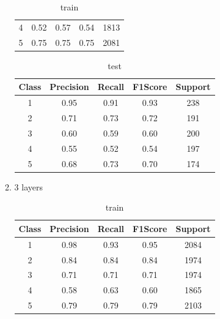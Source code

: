 \begin{enumerate}[label=(\alph*)]
\begin{enumerate}[label=\roman*.]
\begin{table}[!htb]
\begin{tabular}{ccccc}
            4     & 0.52      & 0.57   & 0.54    & 1813    \\
            5     & 0.75      & 0.75   & 0.75    & 2081    \\ \hline
            \end{tabular}
            \caption{train}
            \label{part e train depth 2}
        \end{table}
        \begin{table}[!htb]
            \centering
            \begin{tabular}{ccccc}
            \hline
            Class & Precision & Recall & F1Score & Support \\ \hline
            1     & 0.95      & 0.91   & 0.93    & 238     \\
            2     & 0.71      & 0.73   & 0.72    & 191     \\
            3     & 0.60      & 0.59   & 0.60    & 200     \\
            4     & 0.55      & 0.52   & 0.54    & 197     \\
            5     & 0.68      & 0.73   & 0.70    & 174     \\ \hline
            \end{tabular}
            \caption{test}
            \label{part e test depth 2}
        \end{table}
        \item 3 layers
        \begin{table}[!htb]
            \centering
            \begin{tabular}{ccccc}
            \hline
            Class & Precision & Recall & F1Score & Support \\ \hline
            1     & 0.98      & 0.93   & 0.95    & 2084    \\
            2     & 0.84      & 0.84   & 0.84    & 1974    \\
            3     & 0.71      & 0.71   & 0.71    & 1974    \\
            4     & 0.58      & 0.63   & 0.60    & 1865    \\
            5     & 0.79      & 0.79   & 0.79    & 2103    \\ \hline
            \end{tabular}
            \caption{train}
            \label{part e train depth 3}
        \end{table}
        \begin{table}[!htb]
            \centering
            \begin{tabular}{ccccc}

\end{tabular}
\end{table}
\end{enumerate}
\end{enumerate}
